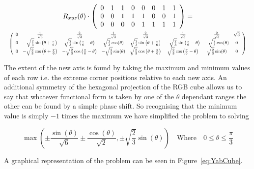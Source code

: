 \begin{multline}\label{eq:YabCube}
  R_{xyz}(\theta)\cdot\left(
\begin{array}{cccccccc}
 0 & 1 & 1 & 0 & 0 & 0 & 1 & 1 \\
 0 & 0 & 1 & 1 & 1 & 0 & 0 & 1 \\
 0 & 0 & 0 & 0 & 1 & 1 & 1 & 1 \\
\end{array}
\right) = \\
\resizebox{\textwidth}{!}{%
$\displaystyle
\left(
\begin{array}{cccccccc}
 0 & \frac{1}{\sqrt{3}} & \frac{2}{\sqrt{3}} & \frac{1}{\sqrt{3}} & \frac{2}{\sqrt{3}} & \frac{1}{\sqrt{3}} & \frac{2}{\sqrt{3}} & \sqrt{3} \\
 0 & -\sqrt{\frac{2}{3}} \sin \left(\theta +\Pii{6}\right) & \sqrt{\frac{2}{3}} \sin \left(\Pii{6}-\theta \right) & \sqrt{\frac{2}{3}} \cos (\theta ) & \sqrt{\frac{2}{3}} \sin \left(\theta +\Pii{6}\right) & -\sqrt{\frac{2}{3}} \sin \left(\Pii{6}-\theta \right) & -\sqrt{\frac{2}{3}} \cos (\theta ) & 0 \\
 0 & -\sqrt{\frac{2}{3}} \cos \left(\theta +\Pii{6}\right) & -\sqrt{\frac{2}{3}} \cos \left(\Pii{6}-\theta \right) & -\sqrt{\frac{2}{3}} \sin (\theta ) & \sqrt{\frac{2}{3}} \cos \left(\theta +\Pii{6}\right) & \sqrt{\frac{2}{3}} \cos \left(\Pii{6}-\theta \right) & \sqrt{\frac{2}{3}} \sin (\theta ) & 0 \\
\end{array}
\right)$}
\end{multline}


The extent of the new axis is found by taking the maximum and minimum values of each row i.e. the extreme corner positions relative to each new axis. An additional symmetry of the hexagonal projection of the RGB cube allows us to say that whatever functional form is taken by one of the $\theta$ dependant ranges the other can be found by a simple phase shift. So recognising that the minimum value is simply $-1$ times the maximum we have simplified the problem to solving

\begin{equation}\label{eq:AxisRangeMinMax}
 \max\left(\pm\frac{\sin (\theta )}{\sqrt{6}}\pm\frac{\cos (\theta )}{\sqrt{2}}, \pm\sqrt{\frac{2}{3}} \sin (\theta ) \right) \quad \text{Where} \quad 0\leq \theta \leq \frac{\pi}{3}
\end{equation}

A graphical representation of the problem can be seen in Figure~\ref{eq:YabCube}.


